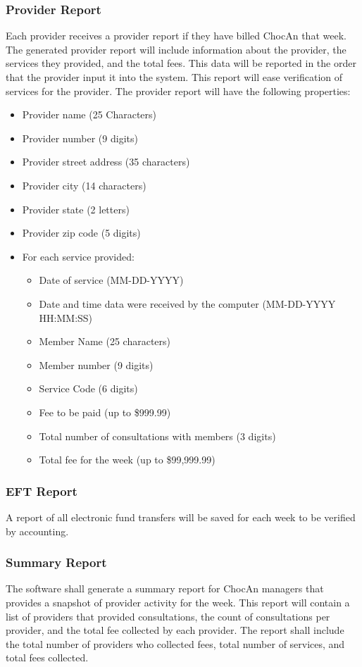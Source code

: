 \documentclass{article}
\begin{document}
\subsubsection{Provider Report}
Each provider receives a provider report if they have billed ChocAn that week. The generated provider report will include information about the provider, the services they provided, and the total fees. This data will be reported in the order that the provider input it into the system. This report will ease verification of services for the provider. The provider report will have the following properties:
\begin{itemize}
\item Provider name (25 Characters)
\item Provider number (9 digits)
\item Provider street address (35  characters)
\item Provider city (14 characters)
\item Provider state (2 letters)
\item Provider zip code (5 digits)
\item For each service provided:
\begin{itemize}
\item Date of service (MM-DD-YYYY)
\item Date and time data were received by the computer (MM-DD-YYYY HH:MM:SS)
\item Member Name (25 characters)
\item Member number (9 digits)
\item Service Code (6 digits)
\item Fee to be paid (up to \$999.99)
\item Total number of consultations with members (3 digits)
\item Total fee for the week (up to \$99,999.99)
\end{itemize}
\end{itemize}
\subsubsection{EFT Report}
A report of all electronic fund transfers will be saved for each week to be verified by accounting.

\subsubsection{Summary Report}
The software shall generate a summary report for ChocAn managers that provides a snapshot of provider activity for the week. This report will contain a list of providers that provided consultations, the count of consultations per provider, and the total fee collected by each provider. The report shall include the total number of providers who collected fees, total number of services, and total fees collected.
\end{document}
